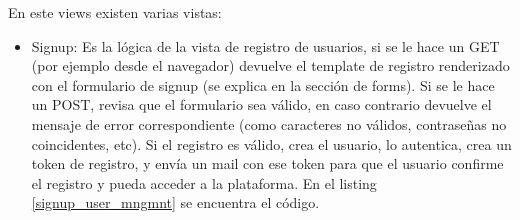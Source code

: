 En este views existen varias vistas:

\begin{itemize}
    \item Signup: Es la lógica de la vista de registro de usuarios, si se le hace un GET (por ejemplo desde el navegador) devuelve el template de registro renderizado con el formulario de signup (se explica en la sección de forms). Si se le hace un POST, revisa que el formulario sea válido, en caso contrario devuelve el mensaje de error correspondiente (como caracteres no válidos, contraseñas no coincidentes, etc). Si el registro es válido, crea el usuario, lo autentica,  crea un token de registro, y envía un mail con ese token para que el usuario confirme el registro y pueda acceder a la plataforma. En el listing \ref{signup_user_mngmnt} se encuentra el código.

\begin{figure}[H]


\end{figure}
\end{itemize}
